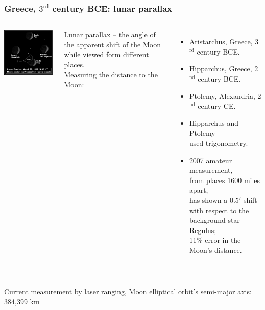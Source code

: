 \documentclass[aspectratio=169,xcolor=pdftex,dvipsnames]{beamer} %
\begin{document}
\begin{frame}
\frametitle{Greece, $3^{\text{rd}}$ century BCE: lunar parallax}

\begin{columns}
        
      \includegraphics[width=75mm]{lunarParallax.png}
           
Lunar parallax -- the angle of the apparent shift of the Moon while viewed form different places.\\

Measuring the distance to the Moon:
           \begin{itemize}
           \item
           Aristarchus, Greece, 3$^{\text{rd}}$ century BCE.
           \item
           Hipparchus, Greece, 2$^{\text{nd}}$ century BCE.
           \item
           Ptolemy, Alexandria, 2$^{\text{nd}}$ century CE.
           \item
           Hipparchus and Ptolemy\\ used trigonometry.
           \item
            2007 amateur measurement,\\
             from places 1600 miles apart,\\
            has shown a $0.5'$ shift
             with respect to the 
             background star Regulus;\\ 
             11\% error in the Moon's distance.
            \end{itemize}
\end{columns} 
\ \\
\hspace{-0.7cm}
Current measurement by laser ranging, Moon elliptical orbit's
semi-major axis: 384,399 km

\end{frame}
\end{document}
